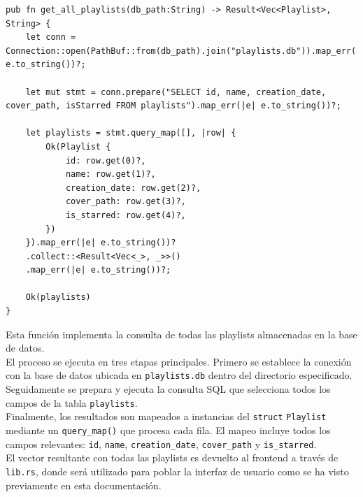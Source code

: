 \documentclass[11pt, a4paper]{article}
\begin{document}
            \begin{lstlisting}[caption={fn get\_all\_playlists()}]
pub fn get_all_playlists(db_path:String) -> Result<Vec<Playlist>, String> {
    let conn = Connection::open(PathBuf::from(db_path).join("playlists.db")).map_err(|e| e.to_string())?;

    let mut stmt = conn.prepare("SELECT id, name, creation_date, cover_path, isStarred FROM playlists").map_err(|e| e.to_string())?;

    let playlists = stmt.query_map([], |row| {
        Ok(Playlist {
            id: row.get(0)?,
            name: row.get(1)?,
            creation_date: row.get(2)?,
            cover_path: row.get(3)?,
            is_starred: row.get(4)?,
        })
    }).map_err(|e| e.to_string())?
    .collect::<Result<Vec<_>, _>>()
    .map_err(|e| e.to_string())?;

    Ok(playlists)
}
            \end{lstlisting}

            Esta función implementa la consulta de todas las playlists almacenadas en la base de datos. \\

            El proceso se ejecuta en tres etapas principales. Primero se establece la conexión con la base de datos ubicada en \verb|playlists.db| dentro del directorio especificado. \\

            Seguidamente se prepara y ejecuta la consulta SQL que selecciona todos los campos de la tabla \verb|playlists|. \\

            Finalmente, los resultados son mapeados a instancias del \verb|struct| \verb|Playlist| mediante un \verb|query_map()| que procesa cada fila. El mapeo incluye todos los campos relevantes: \verb|id|, \verb|name|, \verb|creation_date|, \verb|cover_path| y \verb|is_starred|. \\

            El vector resultante con todas las playlists es devuelto al frontend a través de \verb|lib.rs|, donde será utilizado para poblar la interfaz de usuario como se ha visto previamente en esta documentación.
\end{document}
